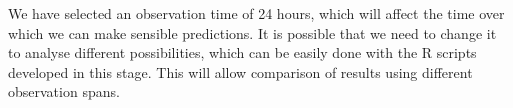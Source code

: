 \documentclass[a4paper,12pt]{article}
\begin{document}
We have selected an observation time of 24 hours, which will affect the time over which we can make sensible predictions. It is possible that we need to change it to analyse different possibilities, which can be easily done with the R scripts developed in this stage. This will allow comparison of results using different observation spans.

\clearpage

 

\end{document}
